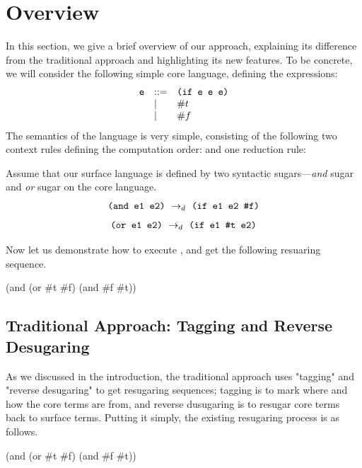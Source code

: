\section{Overview}
\label{sec2}

In this section, we give a brief overview of our approach, explaining its difference from the traditional approach and highlighting its new features. To be concrete, we will consider the following simple core language, defining the  expressions:
\[
\begin{array}{lll}
\mbox{\tt e} &::=& \texttt{(if~e~e~e)}\\
& |& \#t\\
& |& \#f
\end{array}
\]
The semantics of the language is very simple, consisting of the following two context rules defining the computation order:
{\rightarrow{}}
and one reduction rule:

Assume that our surface language is defined by two syntactic sugars---\emph{and} sugar and \emph{or} sugar on the core language.
\[
\texttt{(and e1 e2)} ~\rightarrow_d~ \texttt{(if e1 e2 \#f)}
\]
\[
\texttt{(or e1 e2)} ~\rightarrow_d~ \texttt{(if e1 \#t e2)}
\]

Now let us demonstrate how to execute , and get the following resuaring sequence.
\begin{Codes}
    (and (or \#t \#f) (and \#f \#t))
\end{Codes}



\subsection{Traditional Approach: Tagging and Reverse Desugaring}

As we discussed in the introduction, the traditional approach uses "tagging" and "reverse desugaring" to get resugaring sequences; tagging is to mark where and how the core terms are from, and reverse dusugaring is to resugar core terms back to surface terms. Putting it simply, the existing resugaring process is as follows.

\begin{Codes}
    (and (or \#t \#f) (and \#f \#t))
 
\end{Codes}

